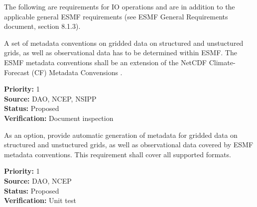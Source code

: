 

The following are requirements for IO operations and are in addition
to the applicable general ESMF requirements (see ESMF General 
Requirements document, section 8.1.3).



A set of metadata conventions on gridded data on structured and
unstuctured grids, as well as observational data has to be determined
within ESMF. The ESMF metadata conventions shall be an extension of the NetCDF 
Climate-Forecast (CF) Metadata Convensions \cite{NetCDF_CF_v1_beta3}.


\begin{reqlist}
{\bf Priority:} 1 \\
{\bf Source:} DAO, NCEP, NSIPP \\
{\bf Status:} Proposed \\
{\bf Verification:} Document inspection \\
\end{reqlist}


As an option, provide automatic generation of metadata for gridded
data on structured and unstuctured grids, as well as observational
data covered by ESMF metadata conventions. This requirement shall
cover all supported formats.

\begin{reqlist}
{\bf Priority:} 1 \\
{\bf Source:} DAO, NCEP \\
{\bf Status:} Proposed \\
{\bf Verification:} Unit test \\
\end{reqlist}




